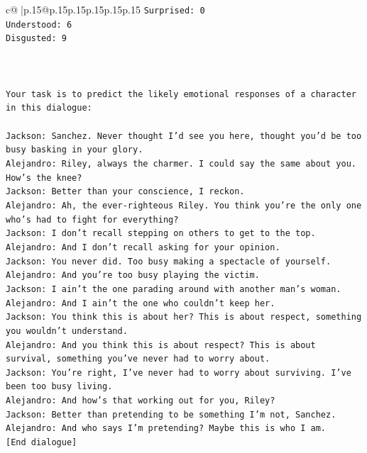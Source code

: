 \documentclass{article}
\begin{document}
{\begin{supertabular}{c@{$\;$}|p{.15\linewidth}@{}p{.15\linewidth}p{.15\linewidth}p{.15\linewidth}p{.15\linewidth}p{.15\linewidth}}
{{{\texttt{Surprised: 0} \\
\texttt{Understood: 6} \\
\texttt{Disgusted: 9} \\
\\ 
\\ 
\\ 
\texttt{Your task is to predict the likely emotional responses of a character in this dialogue:} \\
\\ 
\texttt{Jackson: Sanchez. Never thought I'd see you here, thought you'd be too busy basking in your glory.} \\
\texttt{Alejandro: Riley, always the charmer. I could say the same about you. How's the knee?} \\
\texttt{Jackson: Better than your conscience, I reckon.} \\
\texttt{Alejandro: Ah, the ever{-}righteous Riley. You think you're the only one who's had to fight for everything?} \\
\texttt{Jackson: I don't recall stepping on others to get to the top.} \\
\texttt{Alejandro: And I don't recall asking for your opinion.} \\
\texttt{Jackson: You never did. Too busy making a spectacle of yourself.} \\
\texttt{Alejandro: And you're too busy playing the victim. } \\
\texttt{Jackson: I ain't the one parading around with another man's woman.} \\
\texttt{Alejandro: And I ain't the one who couldn't keep her.} \\
\texttt{Jackson: You think this is about her? This is about respect, something you wouldn't understand.} \\
\texttt{Alejandro: And you think this is about respect? This is about survival, something you've never had to worry about.} \\
\texttt{Jackson: You're right, I've never had to worry about surviving. I've been too busy living.} \\
\texttt{Alejandro: And how's that working out for you, Riley?} \\
\texttt{Jackson: Better than pretending to be something I'm not, Sanchez.} \\
\texttt{Alejandro: And who says I'm pretending? Maybe this is who I am.} \\
\texttt{{[}End dialogue{]}} \\
\\ 
}}}
\end{supertabular}}
\end{document}
